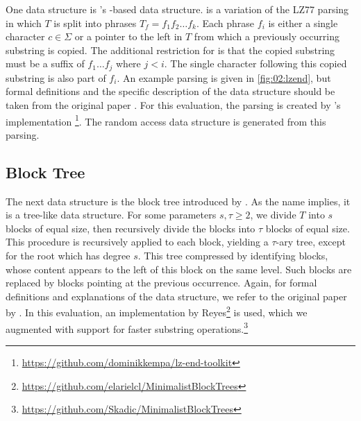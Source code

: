 \documentclass{scrartcl}
\begin{document}
One data structure is \citeauthor{kreft_self-index_2011}'s \lzend{}-based data structure.
\lzend{} is a variation of the LZ77 parsing \cite{ziv_universal_1977} in which $T$ is split into phrases $T_f = f_1 f_2 \dots f_k$.
Each phrase $f_i$ is either a single character $c \in \Sigma$ or a pointer to the left in $T$ from which a previously occurring substring is copied. The additional restriction for \lzend{} is that the copied substring must be a suffix of $f_1 \dots f_j$ where $j < i$.
The single character following this copied substring is also part of $f_i$.
An example parsing is given in \cref{fig:02:lzend}, but formal definitions and the specific description of the data structure should be taken from the original paper \cite{kreft_self-index_2011}.
For this evaluation, the parsing is created by \citeauthor{kempa_lz-end_2017}'s implementation \cite{kempa_lz-end_2017}\footnote{\url{https://github.com/dominikkempa/lz-end-toolkit}}.
The random access data structure is generated from this parsing.

\subsection{Block Tree}

The next data structure is the block tree introduced by \citeauthor{belazzougui_block_2021} \cite{belazzougui_block_2021}.
As the name implies, it is a tree-like data structure.
For some parameters $s, \tau \geq 2$, we divide $T$ into $s$ blocks of equal size, then recursively divide the blocks into $\tau$ blocks of equal size.
This procedure is recursively applied to each block, yielding a $\tau$-ary tree, except for the root which has degree $s$.
This tree compressed by identifying blocks, whose content appears to the left of this block on the same level.
Such blocks are replaced by blocks pointing at the previous occurrence.
Again, for formal definitions and explanations of the data structure, we refer to the original paper by \citeauthor{belazzougui_block_2021} \cite{belazzougui_block_2021}.
In this evaluation, an implementation by Reyes\footnote{\url{https://github.com/elarielcl/MinimalistBlockTrees}} is used, which we augmented with support for faster substring operations.\footnote{\url{https://github.com/Skadic/MinimalistBlockTrees}}
\end{document}
